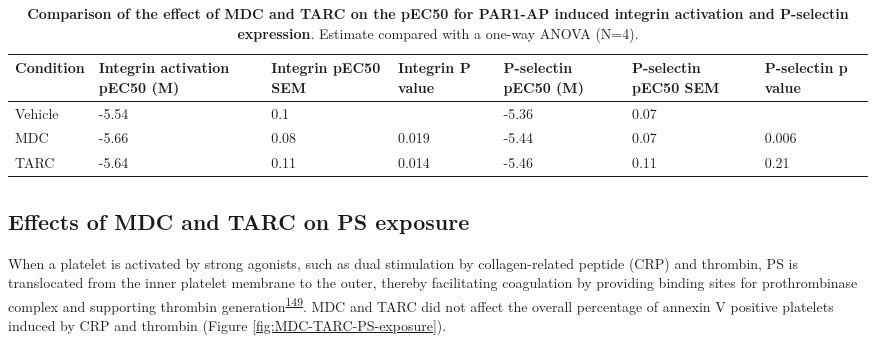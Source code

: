\documentclass[11pt,twoside]{bristolthesis}
\begin{document}
\begin{table}

\caption[Comparison of the effect of MDC and TARC on the pEC50 for PAR1-AP induced integrin activation and P-selectin expression]{\label{tab:chemokines-integrin-pselectin}\textbf{Comparison of the effect of MDC and TARC on the pEC50 for PAR1-AP induced integrin activation and P-selectin expression}. Estimate compared with a one-way ANOVA (N=4).}
\centering
\fontsize{9}{11}\selectfont
\begin{tabu} to 
\toprule
Condition & Integrin activation pEC50 (M) & Integrin pEC50 SEM & Integrin P value & P-selectin pEC50 (M) & P-selectin pEC50 SEM & P-selectin p value\\
\midrule
Vehicle & -5.54 & 0.1 &  & -5.36 & 0.07 & \\
MDC & -5.66 & 0.08 & 0.019 & -5.44 & 0.07 & 0.006\\
TARC & -5.64 & 0.11 & 0.014 & -5.46 & 0.11 & 0.21\\
\bottomrule
\end{tabu}
\end{table}
\hypertarget{effects-of-mdc-and-tarc-on-ps-exposure}{%
\subsection{Effects of MDC and TARC on PS exposure}\label{effects-of-mdc-and-tarc-on-ps-exposure}}

When a platelet is activated by strong agonists, such as dual stimulation by collagen-related peptide (CRP) and thrombin, PS is translocated from the inner platelet membrane to the outer, thereby facilitating coagulation by providing binding sites for prothrombinase complex and supporting thrombin generation\textsuperscript{\protect\hyperlink{ref-Reddy2020}{149}}. MDC and TARC did not affect the overall percentage of annexin V positive platelets induced by CRP and thrombin (Figure \ref{fig:MDC-TARC-PS-exposure}).
\end{document}
